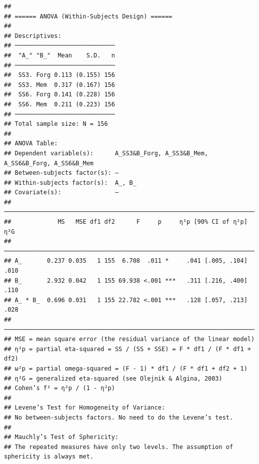 \documentclass[
  man]{apa6}
\begin{document}
\begin{verbatim}
## 
## ====== ANOVA (Within-Subjects Design) ======
## 
## Descriptives:
## ────────────────────────────
##  "A_" "B_"  Mean    S.D.   n
## ────────────────────────────
##  SS3. Forg 0.113 (0.155) 156
##  SS3. Mem  0.317 (0.167) 156
##  SS6. Forg 0.141 (0.228) 156
##  SS6. Mem  0.211 (0.223) 156
## ────────────────────────────
## Total sample size: N = 156
## 
## ANOVA Table:
## Dependent variable(s):      A_SS3&B_Forg, A_SS3&B_Mem, A_SS6&B_Forg, A_SS6&B_Mem
## Between-subjects factor(s): –
## Within-subjects factor(s):  A_, B_
## Covariate(s):               –
## ──────────────────────────────────────────────────────────────────────
##             MS   MSE df1 df2      F     p     η²p [90% CI of η²p]  η²G
## ──────────────────────────────────────────────────────────────────────
## A_       0.237 0.035   1 155  6.708  .011 *     .041 [.005, .104] .010
## B_       2.932 0.042   1 155 69.938 <.001 ***   .311 [.216, .400] .110
## A_ * B_  0.696 0.031   1 155 22.782 <.001 ***   .128 [.057, .213] .028
## ──────────────────────────────────────────────────────────────────────
## MSE = mean square error (the residual variance of the linear model)
## η²p = partial eta-squared = SS / (SS + SSE) = F * df1 / (F * df1 + df2)
## ω²p = partial omega-squared = (F - 1) * df1 / (F * df1 + df2 + 1)
## η²G = generalized eta-squared (see Olejnik & Algina, 2003)
## Cohen’s f² = η²p / (1 - η²p)
## 
## Levene’s Test for Homogeneity of Variance:
## No between-subjects factors. No need to do the Levene’s test.
## 
## Mauchly’s Test of Sphericity:
## The repeated measures have only two levels. The assumption of sphericity is always met.
\end{verbatim}
\end{document}
